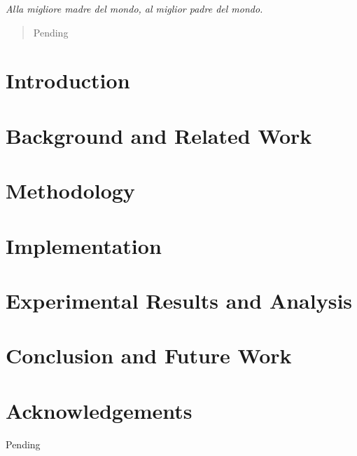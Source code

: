 \documentclass[12pt,a4paper,openright,twoside]{report}
\begin{document}

\clearpage{\pagestyle{empty}\cleardoublepage}
\begin{titlepage}
	\setcounter{page}{3}
	\thispagestyle{empty}
	\topmargin=6.5cm
	\raggedleft
	\large
	\em
	Alla migliore madre del mondo,\linebreak
	al miglior padre del mondo.\linebreak
	\newpage
	\clearpage{\pagestyle{empty}\cleardoublepage}
\end{titlepage}
\clearpage{\pagestyle{empty}\cleardoublepage}
\begin{abstract}
	\setcounter{page}{3}
	Pending
\end{abstract}
\clearpage{\pagestyle{empty}\cleardoublepage}
\clearpage{\pagestyle{empty}\cleardoublepage}
\tableofcontents
{}
\listoffigures
\clearpage{\pagestyle{empty}\cleardoublepage}

\clearpage{\pagestyle{empty}\cleardoublepage}

\chapter{Introduction}
\label{chap:intro}
\lhead[\fancyplain{}{\bfseries\thepage}]{\fancyplain{}{\bfseries\rightmark}}


\chapter{Background and Related Work}
\label{chap:background}
\lhead[\fancyplain{}{\bfseries\thepage}]{\fancyplain{}{\bfseries\rightmark}}


\chapter{Methodology}
\label{chap:methodology}
\lhead[\fancyplain{}{\bfseries\thepage}]{\fancyplain{}{\bfseries\rightmark}}


\chapter{Implementation}
\label{chap:implementation}
\lhead[\fancyplain{}{\bfseries\thepage}]{\fancyplain{}{\bfseries\rightmark}}


\chapter{Experimental Results and Analysis}
\label{chap:results}
\lhead[\fancyplain{}{\bfseries\thepage}]{\fancyplain{}{\bfseries\rightmark}}


\chapter{Conclusion and Future Work}
\label{chap:conclusion}
\lhead[\fancyplain{}{\bfseries\thepage}]{\fancyplain{}{\bfseries\rightmark}}




\chapter*{Acknowledgements}
Pending
\end{document}

